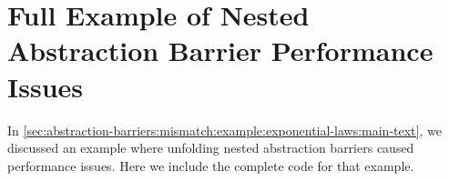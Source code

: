 \section{Full Example of Nested Abstraction Barrier Performance Issues}\label{sec:abstraction-barriers:mismatch:example:exponential-laws:full-code}

In \autoref{sec:abstraction-barriers:mismatch:example:exponential-laws:main-text}, we discussed an example where unfolding nested abstraction barriers caused performance issues.
Here we include the complete code for that example.


\inputminted{coq}{fragments/CategoryExponentialLaws.v}

